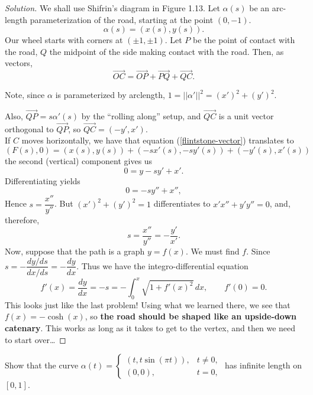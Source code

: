 \documentclass[Shifrin_Solutions_Spring_2018]{subfiles}
\begin{document}
\begin{proof}[Solution] We shall use Shifrin's diagram in Figure 1.13.
Let $\alpha(s)$ be an arc-length parameterization of the road, starting at the
point $(0,-1)$.
\[
\alpha(s) = ( x(s), y(s) ).
\]
Our wheel starts with corners at $(\pm 1, \pm 1)$. Let $P$ be the point of
contact with the road, $Q$ the midpoint of the side making contact with the
road. Then, as vectors,
\begin{equation}\label{flintstone-vector}
\overrightarrow{OC} = \overrightarrow{OP} + \overrightarrow{PQ} + \overrightarrow{QC}.
\end{equation}

Note, since $\alpha$ is parameterized by arclength,
$1=||\alpha'||^2=(x')^2+(y')^2$.

Also, $\overrightarrow{QP} = s\alpha'(s)$ by the ``rolling along'' setup, and
$\overrightarrow{QC}$ is a unit vector orthogonal to $\overrightarrow{QP}$, so
$\overrightarrow{QC} = (-y', x')$.\\

If $C$ moves horizontally, we have that equation (\ref{flintstone-vector})
translates to
\[
(F(s), 0 ) = (x(s), y(s) ) + (-s x'(s) , -sy'(s) ) + (-y'(s), x'(s) )
\]
the second (vertical) component gives us
\[
0 = y -s y' + x' .
\]
Differentiating yields
\[
0 = -s y'' + x'' ,
\]
Hence $s = \dfrac{x''}{y''}$.  But $(x')^2 + (y')^2 = 1$ differentiates to 
$x'x'' + y' y'' = 0$, and, therefore,
\[
s = \dfrac{x''}{y''} = - \dfrac{y'}{x'} .
\]
Now, suppose that the path is a graph $y=f(x)$. We must find $f$. Since 
$s = - \dfrac{dy/ds}{dx/ds} = -\dfrac{dy}{dx}$. Thus we have the integro-differential equation
\[
f'(x) = \dfrac{dy}{dx} = -s = - \int_0^x \sqrt{1 + f'(x)^2 }\, dx, \qquad f'(0) = 0.
\]
This looks just like the last problem! Using what we learned there, we see that 
$f(x) = -\cosh(x)$, so \textbf{the road should be shaped like an upside-down catenary}. 
This works as long as it takes to get to the vertex, and then we need to start over\dots
\end{proof}

\clearpage



\begin{exercise}
Show that the curve $\alpha(t) = \left\{ \begin{matrix}\left(t, t \sin(\pi t)\right), 
& t \neq 0, \\ (0,0), & t = 0, \end{matrix} \right. $ has infinite length on $[0,1]$.
\end{exercise}
\end{document}
